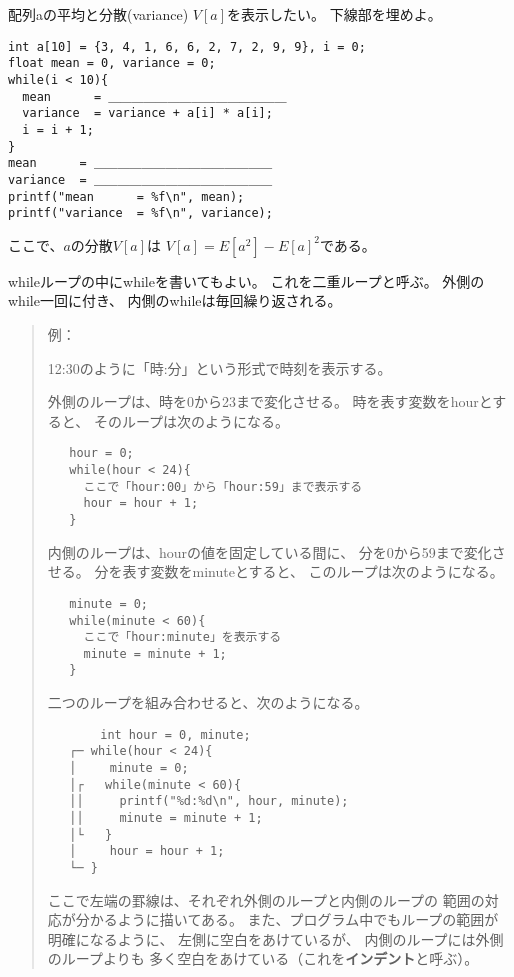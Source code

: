 \documentclass[12pt,a4j]{jarticle}
\makeatletter
\newif\if@myansweropen
\def\themyanswer{%
\immediate\closeout\@filemyanswer%
\global\@myansweropenfalse%
\pagebreak[4]
\begin{multicols*}{2}\raggedright\parindent=1zw
\section*{解答}%
\def\figsize{.6}
\begingroup\small\endgroup%
\end{multicols*}
}
\def\mysection#1{
\pagebreak[4]
\vspace{10ex}\noindent{\vbox{\noindent\rule{\linewidth}{1.5ex}\\
\hbox to .95\linewidth{\hfill \bfseries\Huge%
\thesection.\  #1\hfill}\\
\rule{\linewidth}{1.5ex}
}}
\addcontentsline{toc}{section}{\thesection. #1}
\addtocounter{section}{1}
}
\newcounter{toi}
\def\toi{%
\bigskip\bigskip\noindent
\addtocounter{toi}{1}
\shadowbox{\bfseries\large 問\thetoi}
\nopagebreak[4]\bigskip\nopagebreak[4]
}
\def\figsize{.85}
\makeatother
\begin{document}
\toi

配列{\ttfamily a}の平均と分散(variance) $V[a]$を表示したい。
下線部を埋めよ。
\begin{verbatim}
int a[10] = {3, 4, 1, 6, 6, 2, 7, 2, 9, 9}, i = 0;
float mean = 0, variance = 0;
while(i < 10){
  mean      = ＿＿＿＿＿＿＿＿＿＿＿＿＿＿＿
  variance  = variance + a[i] * a[i];
  i = i + 1;
}
mean      = ＿＿＿＿＿＿＿＿＿＿＿＿＿＿＿
variance  = ＿＿＿＿＿＿＿＿＿＿＿＿＿＿＿
printf("mean      = %f\n", mean);
printf("variance  = %f\n", variance);
\end{verbatim}
ここで、$a$の分散$V[a]$は $V[a] = E[a^2] - E[a]^2$である。









\mysection{二重ループ}

{\ttfamily while}ループの中に{\ttfamily while}を書いてもよい。
これを二重ループと呼ぶ。
外側の{\ttfamily while}一回に付き、
内側の{\ttfamily while}は毎回繰り返される。

\begin{quote}\small
 例：

 12:30のように「時:分」という形式で時刻を表示する。

 外側のループは、時を0から23まで変化させる。
 時を表す変数を{\ttfamily hour}とすると、
 そのループは次のようになる。 
\begin{verbatim}
   hour = 0;
   while(hour < 24){
     ここで「hour:00」から「hour:59」まで表示する
     hour = hour + 1;
   }
\end{verbatim}

内側のループは、{\ttfamily hour}の値を固定している間に、
分を0から59まで変化させる。
分を表す変数を{\ttfamily minute}とすると、
このループは次のようになる。
\begin{verbatim}
   minute = 0;
   while(minute < 60){
     ここで「hour:minute」を表示する
     minute = minute + 1;
   }
\end{verbatim}

二つのループを組み合わせると、次のようになる。
\begin{verbatim}
   　　 int hour = 0, minute;
   ┌─ while(hour < 24){
   │　   minute = 0;
   │┌   while(minute < 60){
   ││     printf("%d:%d\n", hour, minute);
   ││     minute = minute + 1;
   │└   }
   │　   hour = hour + 1;
   └─ }
\end{verbatim}
ここで左端の罫線は、それぞれ外側のループと内側のループの
範囲の対応が分かるように描いてある。
また、プログラム中でもループの範囲が明確になるように、
左側に空白をあけているが、
内側のループには外側のループよりも
多く空白をあけている（これを{\bfseries インデント}と呼ぶ）。


\end{quote}
\end{document}
